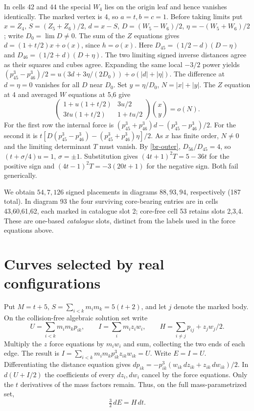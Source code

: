 \documentclass[11pt,letterpaper]{article}
\theoremstyle{definition}
\begin{document}
In cells 42 and 44 the special $W_4$ lies on the origin leaf and hence
vanishes identically. The marked vertex is 4, so $a=t,b=c=1$.
Before taking limits put $x=Z_4$, $S=(Z_5+Z_6)/2$, $d=x-S$,
$D=(W_5-W_6)/2$, $\eta=-(W_5+W_6)/2$; write $D_0=\lim D\ne0$.
The sum of the $Z$ equations gives
$d=(1+t/2)x+o(x)$, since $h=o(x)$. Here
$D_{45}=(1/2-d)(D-\eta)$ and $D_{46}=(1/2+d)(D+\eta)$.
The two limiting signed inverse distances agree as their squares
and cubes agree. Expanding the same local $-3/2$ power yields
$(p_{45}^3-p_{46}^3)/2
=u(3d+3\eta/(2D_0))+o(|d|+|\eta|)$.
The difference at $d=\eta=0$ vanishes for all $D$ near $D_0$.
Set $y=\eta/D_0$, $N=|x|+|y|$. The $Z$ equation at 4 and averaged
$W$ equations at 5,6 give
\[
\begin{pmatrix}
1+u(1+t/2)&3u/2\\ 3tu(1+t/2)&1+tu/2
\end{pmatrix}
\binom{x}{y}=o(N).
\]
For the first row the internal force is
$(p_{45}^3+p_{46}^3)d-(p_{45}^3-p_{46}^3)/2$.
For the second it is
$t[D(p_{45}^3-p_{46}^3)-(p_{45}^3+p_{46}^3)\eta]/2$.
As $x$ has finite order, $N\ne0$ and the limiting determinant $T$
must vanish. By \eqref{br-outer}, $D_{56}/D_{45}=4$, so
$(t+\sigma/4)u=1$, $\sigma=\pm1$. Substitution gives
$(4t+1)^2T=5-36t$ for the positive sign and
$(4t-1)^2T=-3(20t+1)$ for the negative sign. Both fail generically.

We obtain $54,7,126$ signed placements in diagrams $88,93,94$,
respectively (187 total). In diagram 93 the four surviving core-bearing
entries are in cells 43,60,61,62, each marked in catalogue slot 2;
core-free cell 53 retains slots 2,3,4. These are one-based
\emph{catalogue} slots, distinct from the labels used in the force
equations above.

\section{Curves selected by real configurations}
\label{br-real}
Put $M=t+5$, $S=\sum_{i<k}m_i m_k=5(t+2)$, and let $j$ denote the
marked body. On the collision-free algebraic solution set write
\[
 U=\sum_{i<k}m_im_kp_{ik},\qquad I=\sum_i m_i z_iw_i,\qquad
 H=\sum_{i\ne j}p_{ij}+z_jw_j/2 .
\]
Multiply the $z$ force equations by $m_iw_i$ and sum, collecting
the two ends of each edge. The result is
$I=\sum_{i<k}m_im_kp_{ik}^3 z_{ik}w_{ik}=U$. Write $E=I=U$.
Differentiating the distance equation gives
$dp_{ik}=-p_{ik}^3(w_{ik}\,dz_{ik}+z_{ik}\,dw_{ik})/2$.
In $d(U+I/2)$ the coefficients of every $dz_i,dw_i$ cancel by the
force equations. Only the $t$ derivatives of the mass factors remain.
Thus, on the full mass-parametrized set,
\begin{equation}\label{br-env}
 \tfrac32\,dE=H\,dt .
\end{equation}
\end{document}
